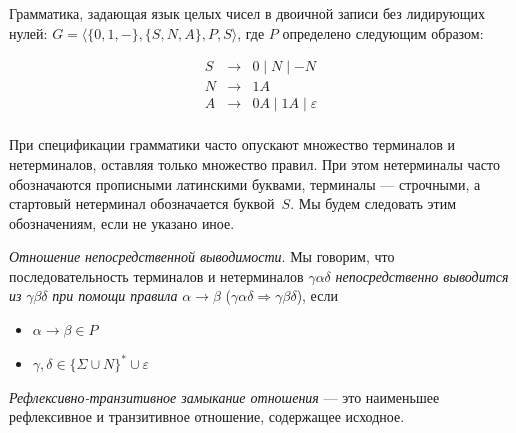 \begin{example}
Грамматика, задающая язык целых чисел в двоичной записи без лидирующих нулей: $G = \langle \{0, 1, -\}, \{S, N, A\}, P, S \rangle$, где $P$ определено следующим образом:

\[
\begin{array}{rcl}
S& \rightarrow & 0 \mid N \mid - N  \\
N& \rightarrow & 1 A \\
A& \rightarrow & 0 A \mid 1 A  \mid \varepsilon\\
\end{array}
\]
\end{example}

При спецификации грамматики часто опускают множество терминалов и нетерминалов, оставляя только множество правил. При этом нетерминалы часто обозначаются прописными латинскими буквами, терминалы --- строчными, а стартовый нетерминал обозначается буквой~$S$. Мы будем следовать этим обозначениям, если не указано иное.


\begin{definition}\label{def derivability in CFG}
  \textit{Отношение непосредственной выводимости}. Мы говорим, что последовательность терминалов и нетерминалов $\gamma \alpha \delta$ \textit{непосредственно выводится из} $\gamma \beta \delta$ \textit{при помощи правила} $\alpha \rightarrow \beta$ ($\gamma \alpha \delta \Rightarrow \gamma \beta \delta$), если
  \begin{itemize}
    \item $\alpha \rightarrow \beta \in P$
    \item $\gamma, \delta \in \{\Sigma \cup N\}^* \cup {\varepsilon}$
  \end{itemize}
\end{definition}

\begin{definition}
  \textit{Рефлексивно-транзитивное замыкание отношения} --- это наименьшее рефлексивное и транзитивное отношение, содержащее исходное.
\end{definition}

